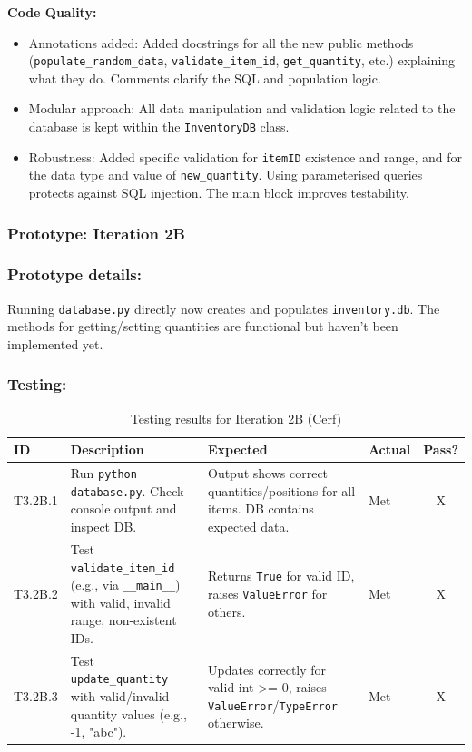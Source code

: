 \textbf{Code Quality:}
\begin{itemize}
	\item Annotations added: Added docstrings for all the new public methods (\verb|populate_random_data|, \verb|validate_item_id|, \verb|get_quantity|, etc.) explaining what they do. Comments clarify the SQL and population logic.
	\item Modular approach: All data manipulation and validation logic related to the database is kept within the \verb|InventoryDB| class.
	\item Robustness: Added specific validation for \verb|itemID| existence and range, and for the data type and value of \verb|new_quantity|. Using parameterised queries protects against SQL injection. The main block improves testability.
\end{itemize}

\newpage
\subsubsection*{Prototype: Iteration 2B}

\newpage

\subsubsection{Prototype details:}
Running \verb|database.py| directly now creates and populates \verb|inventory.db|. The methods for getting/setting quantities are functional but haven't been implemented yet.

\subsubsection{Testing:}
\begin{table}[htbp]
	\centering
	\begin{tabularx}{\textwidth}{|l|X|p{4.5cm}|p{1.5cm}|c|}
		\hline
		\textbf{ID} & \textbf{Description} & \textbf{Expected} & \textbf{Actual} & \textbf{Pass?} \\
		\hline
		T3.2B.1 & Run \verb|python database.py|. Check console output and inspect DB. & Output shows correct quantities/positions for all items. DB contains expected data. & Met & X \\
		\hline
		T3.2B.2 & Test \verb|validate_item_id| (e.g., via \verb|__main__|) with valid, invalid range, non-existent IDs. & Returns \verb|True| for valid ID, raises \verb|ValueError| for others. & Met & X \\
		\hline
		T3.2B.3 & Test \verb|update_quantity| with valid/invalid quantity values (e.g., -1, "abc"). & Updates correctly for valid int >= 0, raises \verb|ValueError|/\verb|TypeError| otherwise. & Met & X \\
		\hline
	\end{tabularx}
	\caption{Testing results for Iteration 2B (Cerf)}
\end{table}

